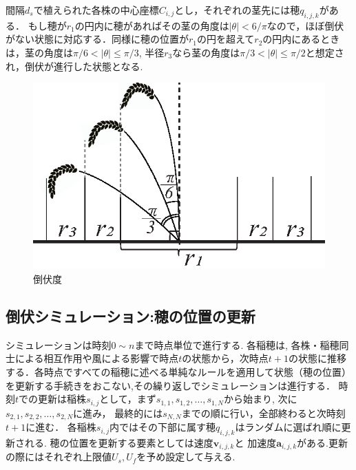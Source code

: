 \documentclass[twocolumn]{jarticle}
\begin{document}
\begin{enumerate}
    間隔$d_s$で植えられた各株の中心座標$C_{i,j}$とし，それぞれの茎先には穂$q_{i,j,k}$がある．
    もし穂が$r_1$の円内に穂があればその茎の角度は$|\theta|<6/\pi$なので，ほぼ倒伏がない状態に対応する．同様に穂の位置が$r_1$の円を超えて$r_2$の円内にあるときは，茎の角度は$\pi/6<|\theta|\le\pi/3$, 半径$r_3$なら茎の角度は$\pi/3<|\theta|\le\pi/2$と想定され，倒伏が進行した状態となる.
    
    \begin{figure}[t]
        \centering
        \includegraphics[width=0.8\linewidth]{fig/lodging-rad.eps}
        \caption{倒伏度}
        \label{fig:lodging-rad}
    \end{figure}

    \end{enumerate}


    \subsection{倒伏シミュレーション:穂の位置の更新} \label{section:update}
    シミュレーションは時刻$0 \sim n$まで時点単位で進行する. 各稲穂は, 各株・稲穂同士による相互作用や風による影響で時点$t$の状態から，次時点$t+1$の状態に推移する．各時点ですべての稲穂に述べる単純なルールを適用して状態（穂の位置）を更新する手続きをおこない,その繰り返しでシミュレーションは進行する．
    時刻$t$での更新は稲株$s_{i,j}$として，まず$s_{1,1}, s_{1,2}, \dots, s_{1,N}$から始まり, 次に$s_{2,1}, s_{2,2}, \dots, s_{2,N}$に進み，
    最終的には$s_{N,N}$までの順に行い，全部終わると次時刻$t+1$に進む．
    各稲株$s_{i,j}$内ではその下部に属す穂$q_{i,j,k}$はランダムに選ばれ順に更新される. 
    穂の位置を更新する要素としては速度$\mathbf{v}_{i,j,k}$と
    加速度$\mathbf{a}_{i,j,k}$がある.更新の際にはそれぞれ上限値$U_s, U_f$を予め設定して与える. 


\end{document}
